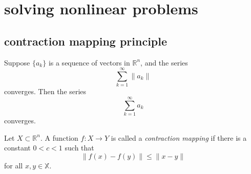 \documentclass[12pt]{article}
\begin{document}


\section{solving nonlinear problems} %

\subsection{contraction mapping principle} %

\begin{proposition}
	Suppose $\{a_k\}$ is a sequence of vectors in $\mathbb{R}^n$, and the series 
	\begin{equation*}
		\sum_{k=1}^\infty \|a_k\|
	\end{equation*}
	converges. Then the series 
	\begin{equation*}
		\sum_{k=1}^\infty a_k
	\end{equation*}
	converges.
\end{proposition}

\begin{definition}
	Let $X\subset\mathbb{R}^n$. A function $f:X\to Y$ is called a \emph{contraction mapping} if there is a constant $0<c<1$ such that 
	\begin{equation*}
		\|f(x)-f(y)\| \leq \|x-y\|
	\end{equation*}
	for all $x,y\in\mathbb{X}$. 
\end{definition}
\end{document}
